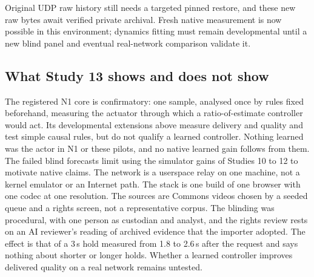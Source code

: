 Original UDP raw history still needs a targeted pinned restore, and these new raw bytes await verified private archival. Fresh native measurement is now possible in this environment; dynamics fitting must remain developmental until a new blind panel and eventual real-network comparison validate it.

\subsection{What Study 13 shows and does not show}
The registered N1 core is confirmatory: one sample, analysed once by rules fixed beforehand, measuring the actuator through which a ratio-of-estimate controller would act. Its developmental extensions above measure delivery and quality and test simple causal rules, but do not qualify a learned controller. Nothing learned was the actor in N1 or these pilots, and no native learned gain follows from them. The failed blind forecasts limit using the simulator gains of Studies 10 to 12 to motivate native claims. The network is a userspace relay on one machine, not a kernel emulator or an Internet path. The stack is one build of one browser with one codec at one resolution. The sources are \NOneSources{} Commons videos chosen by a seeded queue and a rights screen, not a representative corpus. The blinding was procedural, with one person as custodian and analyst, and the rights review rests on an AI reviewer's reading of archived evidence that the importer adopted. The effect is that of a 3\,s hold measured from 1.8 to 2.6\,s after the request and says nothing about shorter or longer holds. Whether a learned controller improves delivered quality on a real network remains untested.
